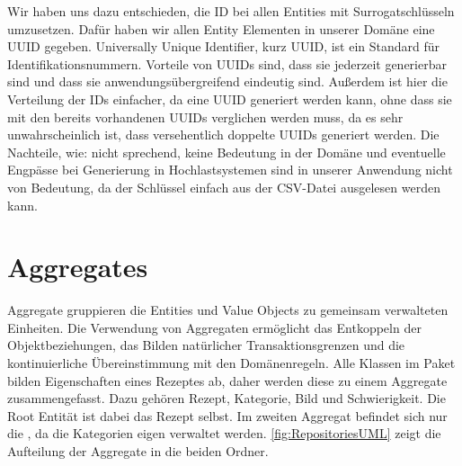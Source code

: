 Wir haben uns dazu entschieden, die ID bei allen Entities mit Surrogatschlüsseln umzusetzen. Dafür haben wir allen Entity Elementen in unserer Domäne eine UUID gegeben. Universally Unique Identifier, kurz UUID, ist ein Standard für Identifikationsnummern. Vorteile von UUIDs sind, dass sie jederzeit generierbar sind und dass sie anwendungsübergreifend eindeutig sind. Außerdem ist hier die Verteilung der IDs einfacher, da eine UUID generiert werden kann, ohne dass sie mit den bereits vorhandenen UUIDs verglichen werden muss, da es sehr unwahrscheinlich ist, dass versehentlich doppelte UUIDs generiert werden. Die Nachteile, wie: nicht sprechend, keine Bedeutung in der Domäne und eventuelle Engpässe bei Generierung in
Hochlastsystemen sind in unserer Anwendung nicht von Bedeutung, da der Schlüssel einfach aus der CSV-Datei ausgelesen werden kann.

\section{Aggregates}
Aggregate gruppieren die Entities und Value Objects zu gemeinsam verwalteten Einheiten. Die Verwendung von Aggregaten ermöglicht das Entkoppeln der Objektbeziehungen, das Bilden natürlicher Transaktionsgrenzen und die kontinuierliche Übereinstimmung mit den Domänenregeln.
Alle Klassen im Paket \href{https://github.com/MichaelaHaag/RezeptApp/tree/main/3-Domain-Code/src/main/java/de/rezeptapp/domain/Rezept}{} bilden Eigenschaften eines Rezeptes ab, daher werden diese zu einem Aggregate zusammengefasst. Dazu gehören Rezept, Kategorie, Bild und Schwierigkeit. Die Root Entität ist dabei das Rezept selbst. Im zweiten Aggregat befindet sich nur die \href{https://github.com/MichaelaHaag/RezeptApp/tree/main/3-Domain-Code/src/main/java/de/rezeptapp/domain/Kategorie}{}, da die Kategorien eigen verwaltet werden. \autoref{fig:RepositoriesUML} zeigt die Aufteilung der Aggregate in die beiden Ordner. 

